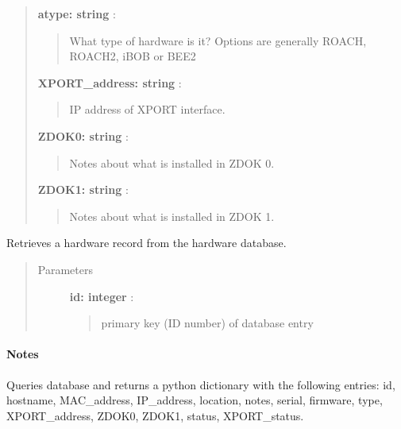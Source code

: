 \documentclass[letterpaper,10pt,english]{sphinxmanual}
\begin{document}
\begin{fulllineitems}
\begin{quote}
\begin{description}
\textbf{atype: string} :
\begin{quote}

What type of hardware is it? Options are generally ROACH, ROACH2, iBOB or BEE2
\end{quote}

\textbf{XPORT\_address: string} :
\begin{quote}

IP address of XPORT interface.
\end{quote}

\textbf{ZDOK0: string} :
\begin{quote}

Notes about what is installed in ZDOK 0.
\end{quote}

\textbf{ZDOK1: string} :
\begin{quote}

Notes about what is installed in ZDOK 1.
\end{quote}

\end{description}\end{quote}

\end{fulllineitems}



\begin{fulllineitems}
\label{index:roachnest_helpers.dbget}
Retrieves a hardware record from the hardware database.
\begin{quote}\begin{description}
\item[{Parameters }] \leavevmode
\textbf{id: integer} :
\begin{quote}

primary key (ID number) of database entry
\end{quote}

\end{description}\end{quote}
\paragraph{Notes}

Queries database and returns a python dictionary with the following entries:
id, hostname, MAC\_address, IP\_address, location, notes, serial, firmware, type,
XPORT\_address, ZDOK0, ZDOK1, status, XPORT\_status.

\end{fulllineitems}
\end{document}
